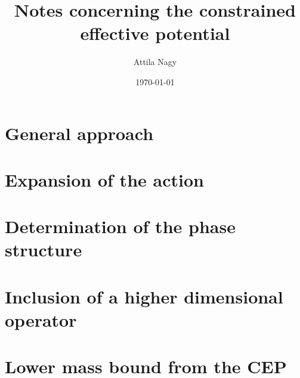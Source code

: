 \documentclass[a4paper,10pt,final]{article}
\title{Notes concerning the constrained effective potential}
\author{Attila Nagy}
\date{\today}
\numberwithin{equation}{section} %
\begin{document}
\section{General approach}

%
\section{Expansion of the action}

\section{Determination of the phase structure}

\section{Inclusion of a higher dimensional operator}

\section{Lower mass bound from the CEP}


% 
% 
%
\end{document}
